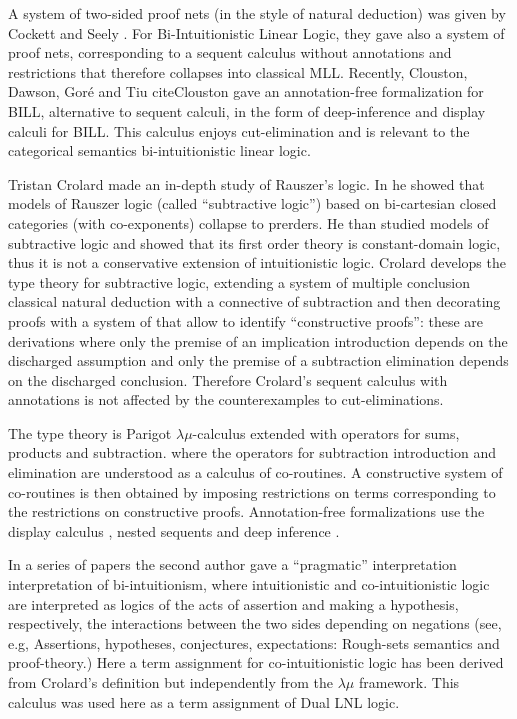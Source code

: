 A system of two-sided proof nets (in the style of natural deduction)
was given by Cockett and Seely \cite{Cockett:1997}.  For
Bi-Intuitionistic Linear Logic, they gave also a system of proof nets,
corresponding to a sequent calculus without annotations and
restrictions that therefore collapses into classical MLL.  Recently,
Clouston, Dawson, Goré and Tiu cite{Clouston} gave an annotation-free
formalization for BILL, alternative to sequent calculi, in the form of
deep-inference and display calculi for BILL. This calculus enjoys
cut-elimination and is relevant to the categorical semantics
bi-intuitionistic linear logic.
 
Tristan Crolard \cite{Crolard:2001,Crolard:2004} made an in-depth
study of Rauszer's logic. In \cite{Crolard:2001} he showed that models
of Rauszer logic (called ``subtractive logic'') based on bi-cartesian
closed categories (with co-exponents) collapse to prerders.  He than
studied models of subtractive logic and showed that its first order
theory is constant-domain logic, thus it is not a conservative
extension of intuitionistic logic.  Crolard \cite{Crolard:2004}
develops the type theory for subtractive logic, extending a system of
multiple conclusion classical natural deduction with a connective of
subtraction and then decorating proofs with a system of
\cite{annotationsofdependencies} that allow to identify ``constructive
proofs'': these are derivations where only the premise of an
implication introduction depends on the discharged assumption and only
the premise of a subtraction elimination depends on the discharged
conclusion. Therefore Crolard's sequent calculus with annotations is
not affected by the counterexamples to cut-eliminations.

The type theory is Parigot $\lambda\mu$-calculus extended with
operators for sums, products and subtraction.  where the operators for
subtraction introduction and elimination are understood as a calculus
of co-routines.  A constructive system of co-routines is then obtained
by imposing restrictions on terms corresponding to the restrictions on
constructive proofs.  Annotation-free formalizations use the display
calculus \cite{Gore:2000}, nested sequents \cite{GorePostnieceTiu:2008}
and deep inference \cite{Postniece:2009}.

In a series of papers the second author gave a ``pragmatic''
interpretation interpretation of bi-intuitionism, where intuitionistic
and co-intuitionistic logic are interpreted as logics of the acts of
assertion and making a hypothesis, respectively, the interactions
between the two sides depending on negations (see, e.g,
\cite{Bellin:2014} Assertions, hypotheses, conjectures, expectations:
Rough-sets semantics and proof-theory.)  Here a term assignment for
co-intuitionistic logic has been derived from Crolard's definition but
independently from the $\lambda\mu$ framework. This calculus was used
here as a term assignment of Dual LNL logic.

